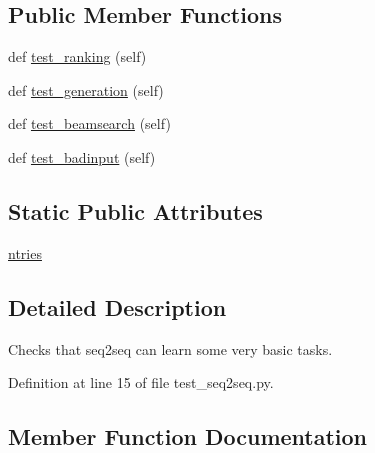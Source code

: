 \subsection*{Public Member Functions}
\begin{DoxyCompactItemize}
\item 
def \hyperlink{classtests_1_1test__seq2seq_1_1TestSeq2Seq_a967d49fc0e124148c7ac4488dd788bc7}{test\+\_\+ranking} (self)
\item 
def \hyperlink{classtests_1_1test__seq2seq_1_1TestSeq2Seq_a203ba54e9671ce31936a202a4e2e6686}{test\+\_\+generation} (self)
\item 
def \hyperlink{classtests_1_1test__seq2seq_1_1TestSeq2Seq_a78cb1bf4c31e8cd73d53e48797b9d7d9}{test\+\_\+beamsearch} (self)
\item 
def \hyperlink{classtests_1_1test__seq2seq_1_1TestSeq2Seq_ab550295b1910a3576b5b0ed9d426f831}{test\+\_\+badinput} (self)
\end{DoxyCompactItemize}
\subsection*{Static Public Attributes}
\begin{DoxyCompactItemize}
\item 
\hyperlink{classtests_1_1test__seq2seq_1_1TestSeq2Seq_a5681e61335c043954e727fa9eb4b1eb3}{ntries}
\end{DoxyCompactItemize}


\subsection{Detailed Description}
\begin{DoxyVerb}Checks that seq2seq can learn some very basic tasks.
\end{DoxyVerb}
 

Definition at line 15 of file test\+\_\+seq2seq.\+py.



\subsection{Member Function Documentation}
\mbox{\label{classtests_1_1test__seq2seq_1_1TestSeq2Seq_ab550295b1910a3576b5b0ed9d426f831}} 
